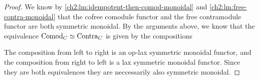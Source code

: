 \begin{proof}


    We know by \cref{ch2:lm:idempotent-then-comod-monoidal} and \cref{ch2:lm:free-contra-monoidal} that the cofree comodule functor and the free contramodule functor are both symmetric monoidal. By the arguments above, we know that the equivalence $\mathrm{Comod}_C\simeq \mathrm{Contra}_C$ is given by the compositions 
    \begin{center}
    \end{center}
    The composition from left to right is an op-lax symmetric monoidal functor, and the composition from right to left is a lax symmetric monoidal functor. Since they are both equivalences they are neccessarily also symmetric monoidal. 
\end{proof}

